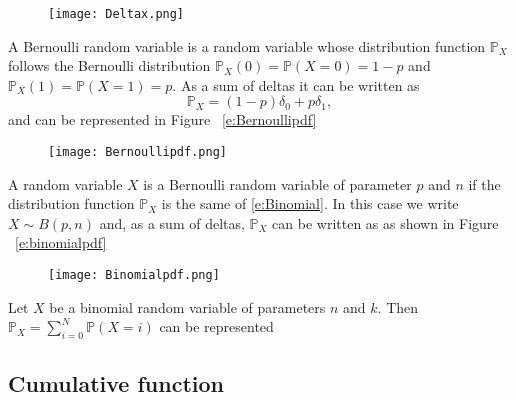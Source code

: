\begin{figure}[h!]
\texttt{[image: Deltax.png]}
\label{f:deltapdf}
\end{figure}


\begin{example}
A Bernoulli random variable is a random variable whose distribution function $\mathbb P_X$ follows the Bernoulli distribution $\mathbb P_X(0) = \mathbb P(X = 0) = 1-p$ and $\mathbb P_X(1) = \mathbb P(X = 1 ) = p$. As a sum of deltas it can be written as 
$$
\mathbb P_X = (1-p)\delta_0 + p \delta_1,
$$
and can be represented in Figure ~\ref{e:Bernoullipdf}
\begin{figure}[h!]
\texttt{[image: Bernoullipdf.png]}
\label{f:Bernoullipdf}
\end{figure}

\end{example}


\begin{example}[Binomial]
A random variable $X$ is a Bernoulli random variable of parameter $p$ and $n$ if the distribution function $\mathbb P_X$ is the same of \eqref{e:Binomial}. In this case we write $X \sim B(p,n)$ and, as a sum of deltas, $\mathbb P_X$  can be written as 
as shown in Figure ~\ref{e:binomialpdf}
\begin{figure}[h!]
\texttt{[image: Binomialpdf.png]}
\label{f:binomialpdf}
\end{figure}
\end{example}

\begin{example}
Let $X$ be a binomial random variable of parameters $n$ and $k$. Then $\mathbb P_X = \sum_{ i = 0 }^N \mathbb P(X = i)$ can be represented 
\end{example}


\subsection{Cumulative function}

